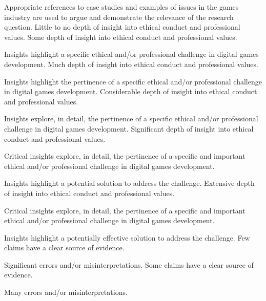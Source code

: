 \documentclass{../../fal_assignment}
\begin{document}
\begin{markingrubric}
            \par 		Appropriate references to case studies and examples of issues in the games industry are used to argue and demonstrate the relevance of the research question.
%
        \grade  \fail	Little to no depth of insight into ethical conduct and professional values.
        \grade 		Some depth of insight into ethical conduct and professional values.
        \par 		Insights highlight a specific ethical and/or professional challenge in digital games development.
        \grade 		Much depth of insight into ethical conduct and professional values.
        \par 		Insights highlight the pertinence of a specific ethical and/or professional challenge in digital games development.
        \grade 		Considerable depth of insight into ethical conduct and professional values.
        \par 		Insights explore, in detail, the pertinence of a specific ethical and/or professional challenge in digital games development.
        \grade 		Significant depth of insight into ethical conduct and professional values.
        \par 		Critical insights explore, in detail, the pertinence of a specific and important ethical and/or professional challenge in digital games development.
         \par 		Insights highlight a potential solution to address the challenge.
        \grade 		Extensive depth of insight into ethical conduct and professional values.
        \par 		Critical insights explore, in detail, the pertinence of a specific and important ethical and/or professional challenge in digital games development.
         \par 		Insights highlight a potentially effective solution to address the challenge.
%
        \grade  \fail	Few claims have a clear source of evidence.
        \par 		Significant errors and/or misinterpretations.
        \grade 		Some claims have a clear source of evidence.
        \par 		Many errors and/or misinterpretations.

\end{markingrubric}
\end{document}
